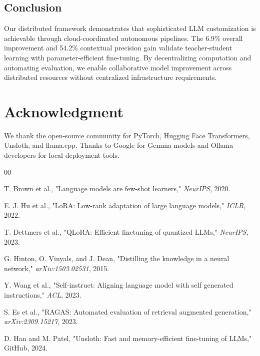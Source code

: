 \documentclass[conference]{IEEEtran}
\begin{document}
\subsection{Conclusion}

Our distributed framework demonstrates that sophisticated LLM customization is achievable through cloud-coordinated autonomous pipelines. The 6.9\% overall improvement and 54.2\% contextual precision gain validate teacher-student learning with parameter-efficient fine-tuning. By decentralizing computation and automating evaluation, we enable collaborative model improvement across distributed resources without centralized infrastructure requirements.

\section*{Acknowledgment}

We thank the open-source community for PyTorch, Hugging Face Transformers, Unsloth, and llama.cpp. Thanks to Google for Gemma models and Ollama developers for local deployment tools.

\begin{thebibliography}{00}

T. Brown et al., "Language models are few-shot learners," \textit{NeurIPS}, 2020.

E. J. Hu et al., "LoRA: Low-rank adaptation of large language models," \textit{ICLR}, 2022.

T. Dettmers et al., "QLoRA: Efficient finetuning of quantized LLMs," \textit{NeurIPS}, 2023.

G. Hinton, O. Vinyals, and J. Dean, "Distilling the knowledge in a neural network," \textit{arXiv:1503.02531}, 2015.

Y. Wang et al., "Self-instruct: Aligning language model with self generated instructions," \textit{ACL}, 2023.

S. Es et al., "RAGAS: Automated evaluation of retrieval augmented generation," \textit{arXiv:2309.15217}, 2023.

D. Han and M. Patel, "Unsloth: Fast and memory-efficient fine-tuning of LLMs," GitHub, 2024.

\end{thebibliography}
\end{document}

